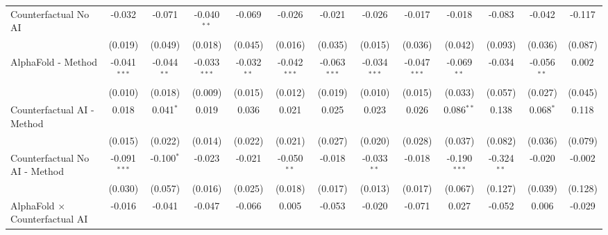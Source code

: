 \begin{tabular}{lcccccccccccc}
   Counterfactual No AI                                       & -0.032         & -0.071        & -0.040$^{**}$  & -0.069        & -0.026         & -0.021         & -0.026         & -0.017         & -0.018         & -0.083        & -0.042        & -0.117\\   
                                                              & (0.019)        & (0.049)       & (0.018)        & (0.045)       & (0.016)        & (0.035)        & (0.015)        & (0.036)        & (0.042)        & (0.093)       & (0.036)       & (0.087)\\   
   AlphaFold - Method                                         & -0.041$^{***}$ & -0.044$^{**}$ & -0.033$^{***}$ & -0.032$^{**}$ & -0.042$^{***}$ & -0.063$^{***}$ & -0.034$^{***}$ & -0.047$^{***}$ & -0.069$^{**}$  & -0.034        & -0.056$^{**}$ & 0.002\\   
                                                              & (0.010)        & (0.018)       & (0.009)        & (0.015)       & (0.012)        & (0.019)        & (0.010)        & (0.015)        & (0.033)        & (0.057)       & (0.027)       & (0.045)\\   
   Counterfactual AI - Method                                 & 0.018          & 0.041$^{*}$   & 0.019          & 0.036         & 0.021          & 0.025          & 0.023          & 0.026          & 0.086$^{**}$   & 0.138         & 0.068$^{*}$   & 0.118\\   
                                                              & (0.015)        & (0.022)       & (0.014)        & (0.022)       & (0.021)        & (0.027)        & (0.020)        & (0.028)        & (0.037)        & (0.082)       & (0.036)       & (0.079)\\   
   Counterfactual No AI - Method                              & -0.091$^{***}$ & -0.100$^{*}$  & -0.023         & -0.021        & -0.050$^{**}$  & -0.018         & -0.033$^{**}$  & -0.018         & -0.190$^{***}$ & -0.324$^{**}$ & -0.020        & -0.002\\   
                                                              & (0.030)        & (0.057)       & (0.016)        & (0.025)       & (0.018)        & (0.017)        & (0.013)        & (0.017)        & (0.067)        & (0.127)       & (0.039)       & (0.128)\\   
   AlphaFold $\times$ Counterfactual AI                       & -0.016         & -0.041        & -0.047         & -0.066        & 0.005          & -0.053         & -0.020         & -0.071         & 0.027          & -0.052        & 0.006         & -0.029\\   

\end{tabular}
